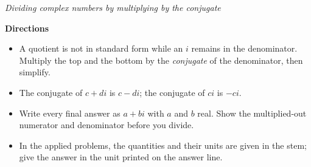 \documentclass[12pt]{article}
\begin{document}

\begin{center}
{\small\textit{Dividing complex numbers by multiplying by the conjugate}}
\end{center}

\vspace{0.15cm}
\noindent\textbf{Directions}
\begin{itemize}[leftmargin=0.7cm, itemsep=1pt, topsep=3pt]
  \item A quotient is not in standard form while an $i$ remains in the denominator.
    Multiply the top and the bottom by the \emph{conjugate} of the denominator, then simplify.
  \item The conjugate of $c + di$ is $c - di$; the conjugate of $ci$ is $-ci$.
  \item Write every final answer as $a + bi$ with $a$ and $b$ real. Show the multiplied-out
    numerator and denominator before you divide.
  \item In the applied problems, the quantities and their units are given in the stem;
    give the answer in the unit printed on the answer line.
\end{itemize}

\vspace{0.2cm}






\end{document}
